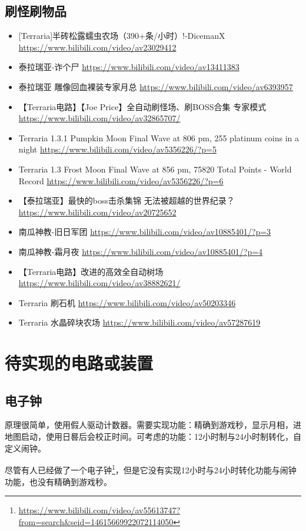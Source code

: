 \section{刷怪刷物品}
\begin{itemize}
\item {[}Terraria]半砖松露蠕虫农场（390+条/小时）!-DicemanX \url{https://www.bilibili.com/video/av23029412}
\item 泰拉瑞亚-诈个尸 \url{https://www.bilibili.com/video/av13411383}
\item 泰拉瑞亚 雕像回血裸装专家月总 \url{https://www.bilibili.com/video/av6393957}
\item 【Terraria电路】【Joe Price】全自动刷怪场、刷BOSS合集 专家模式 \url{https://www.bilibili.com/video/av32865707/}
\item Terraria 1.3.1 Pumpkin Moon Final Wave at 806 pm, 255 platinum coins in a night \url{https://www.bilibili.com/video/av5356226/?p=5}
\item Terraria 1.3 Frost Moon Final Wave at 856 pm, 75820 Total Points - World Record \url{https://www.bilibili.com/video/av5356226/?p=6}
\item 【泰拉瑞亚】最快的boss击杀集锦 无法被超越的世界纪录？ \url{https://www.bilibili.com/video/av20725652}
\item 南瓜神教-旧日军团 \url{https://www.bilibili.com/video/av10885401/?p=3}
\item 南瓜神教-霜月夜 \url{https://www.bilibili.com/video/av10885401/?p=4}
\item 【Terraria电路】改进的高效全自动树场 \url{https://www.bilibili.com/video/av38882621/}
\item Terraria 刷石机 \url{https://www.bilibili.com/video/av50203346}
\item Terraria 水晶碎块农场 \url{https://www.bilibili.com/video/av57287619}
\end{itemize}

\chapter{待实现的电路或装置}

\section{电子钟}
原理很简单，使用假人驱动计数器。需要实现功能：精确到游戏秒，显示月相，进地图启动，使用日晷后会校正时间。可考虑的功能：12小时制与24小时制转化，自定义闹钟。

尽管有人已经做了一个电子钟\footnote{\url{https://www.bilibili.com/video/av55613747?from=search&seid=14615669922072114050}}，但是它没有实现12小时与24小时转化功能与闹钟功能，也没有精确到游戏秒。

